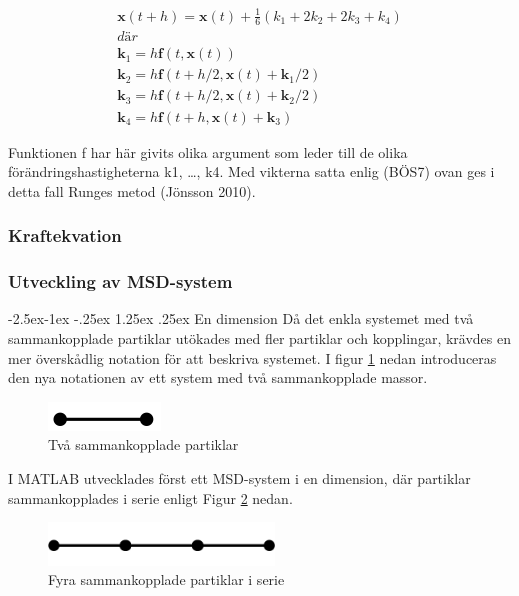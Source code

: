 \documentclass[a4paper,12pt,oneside,final,swedish]{extarticle}
\makeatletter
\renewcommand\paragraph{\@startsection{paragraph}{4}{\z@}%
            {-2.5ex\@plus -1ex \@minus -.25ex}%
            {1.25ex \@plus .25ex}%
            {\normalfont\normalsize\bfseries}}
\makeatother
\begin{document}
\begin{equation}
\begin{split}
\mathbf x(t+h)=\mathbf x(t)+\frac { 1 }{ 6 } ({ k }_{ 1 }+2{ k }_{ 2 }+2{ k }_{ 3 }+{ k }_{ 4 })
\\ där
\\ \mathbf{ k }_{ 1 }=h\mathbf f(t,\mathbf x(t))
\\ \mathbf{ k }_{ 2 }=h\mathbf f(t+h/2,\mathbf x(t)+\mathbf { k }_{ 1 }/2)
\\ \mathbf{ k }_{ 3 }=h\mathbf f(t+h/2,\mathbf x(t)+\mathbf{ k }_{ 2 }/2)
\\ \mathbf{ k }_{ 4 }=h\mathbf f(t+h,\mathbf x(t)+\mathbf{ k }_{ 3 })
\end{split}
\end{equation}

Funktionen f har här givits olika argument som leder till de olika förändringshastigheterna k1, …, k4. Med vikterna satta enlig (BÖS7) ovan ges i detta fall Runges metod (Jönsson 2010).
\subsubsection{Kraftekvation}
\subsubsection{Utveckling av MSD-system}
\paragraph{En dimension}
Då det enkla systemet med två sammankopplade partiklar utökades med fler partiklar och kopplingar, krävdes en mer överskådlig notation för att beskriva systemet. 
I figur \ref{2D_simple::nonfloat} nedan introduceras den nya notationen av ett system med två sammankopplade massor.

\begin{figure}[h!]
  \begin{center}
    \includegraphics[width=3cm]{Bilder/2D_simple.png} 
  \end{center}
  \caption{Två sammankopplade partiklar}
  \label{2D_simple::nonfloat}
\end{figure}
\noindent I MATLAB utvecklades först ett MSD-system i en dimension, där partiklar sammankopplades i serie enligt Figur \ref{simple1D4::nonfloat} nedan.
\begin{figure}[h!]
  \begin{center}
    \includegraphics[width=6cm]{Bilder/simple1D4.png} 
  \end{center}
  \caption{Fyra sammankopplade partiklar i serie}
  \label{simple1D4::nonfloat}
\end{figure}
\end{document}
